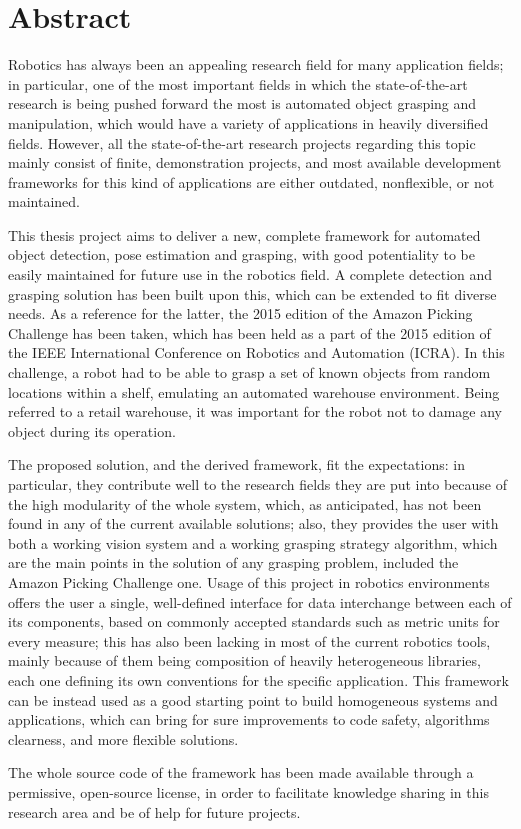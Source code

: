 \chapter*{Abstract}
Robotics has always been an appealing research field for many
application fields; in particular, one of the most
important fields in which the state-of-the-art research is being
pushed forward the most is automated object grasping and manipulation,
which would have a variety of applications in heavily diversified
fields. However,  all the state-of-the-art research projects regarding
this topic mainly consist of finite, demonstration projects, and most
available development frameworks for this kind of applications are
either outdated, nonflexible, or not maintained.

This thesis project aims to deliver a new, complete framework for
automated object detection, pose estimation and grasping, with good
potentiality to be easily maintained for future use in the robotics
field. A complete detection and grasping solution has been built upon
this, which can be extended to fit diverse needs. As a reference for
the latter, the 2015 edition of the Amazon Picking Challenge has been
taken, which has been held as a part of the 2015 edition of the IEEE
International Conference on Robotics and Automation (ICRA). In this
challenge, a robot had to be able to grasp a set of known objects from
random locations within a shelf, emulating an automated warehouse
environment. Being referred to a retail warehouse, it was important
for the robot not to damage any object during its operation.

The proposed solution, and the derived framework, fit the
expectations: in particular, they contribute well to the research
fields they are put into because of the high modularity of the whole
system, which, as anticipated, has not been found in any of the
current available solutions; also, they provides the user with both a
working vision system and a working grasping strategy algorithm, which
are the main points in the solution of any grasping problem, included
the Amazon Picking Challenge one. Usage of this project in robotics
environments offers the user a single, well-defined interface for data
interchange between each of its components, based on commonly accepted
standards such as metric units for every measure; this has also been
lacking in most of the current robotics tools, mainly because of them
being composition of heavily heterogeneous libraries, each one
defining its own conventions for the specific application. This
framework can be instead used as a good starting point to build
homogeneous systems and applications, which can bring for sure
improvements to code safety, algorithms clearness, and more flexible
solutions.

The whole source code of the framework has been made available through
a permissive, open-source license, in order to facilitate knowledge
sharing in this research area and be of help for future projects.
